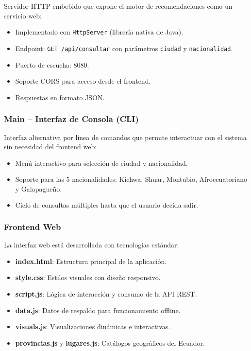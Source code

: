 \documentclass[conference]{IEEEtran}
\begin{document}
Servidor HTTP embebido que expone el motor de recomendaciones como un servicio web:

\begin{itemize}[leftmargin=*]
    \item Implementado con \texttt{HttpServer} (librería nativa de Java).
    \item Endpoint: \texttt{GET /api/consultar} con parámetros \texttt{ciudad} y \texttt{nacionalidad}.
    \item Puerto de escucha: 8080.
    \item Soporte CORS para acceso desde el frontend.
    \item Respuestas en formato JSON.
\end{itemize}

\subsubsection{Main -- Interfaz de Consola (CLI)}

Interfaz alternativa por línea de comandos que permite interactuar con el sistema sin necesidad del frontend web:

\begin{itemize}
    \item Menú interactivo para selección de ciudad y nacionalidad.
    \item Soporte para las 5 nacionalidades: Kichwa, Shuar, Montubio, Afroecuatoriano y Galapagueño.
    \item Ciclo de consultas múltiples hasta que el usuario decida salir.
\end{itemize}

\subsubsection{Frontend Web}

La interfaz web está desarrollada con tecnologías estándar:

\begin{itemize}
    \item \textbf{index.html}: Estructura principal de la aplicación.
    \item \textbf{style.css}: Estilos visuales con diseño responsivo.
    \item \textbf{script.js}: Lógica de interacción y consumo de la API REST.
    \item \textbf{data.js}: Datos de respaldo para funcionamiento offline.
    \item \textbf{visuals.js}: Visualizaciones dinámicas e interactivas.
    \item \textbf{provincias.js} y \textbf{lugares.js}: Catálogos geográficos del Ecuador.
\end{itemize}
\end{document}
